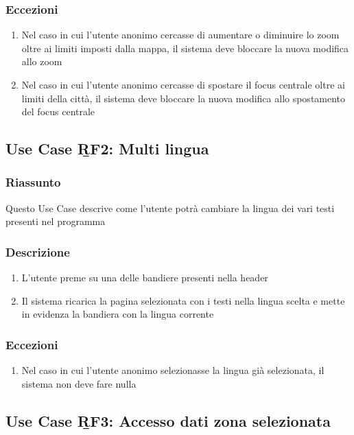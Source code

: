         \subsubsection{Eccezioni}
            \begin{enumerate}
                \item Nel caso in cui l'utente anonimo cercasse di aumentare o diminuire lo zoom oltre ai limiti imposti dalla mappa, il sistema deve bloccare la nuova modifica allo zoom
                \item Nel caso in cui l'utente anonimo cercasse di spostare il focus centrale oltre ai limiti della città, il sistema deve bloccare la nuova modifica allo spostamento del focus centrale
            \end{enumerate}
            
    \subsection{Use Case \b{RF2}: Multi lingua}
        \subsubsection{Riassunto}
            Questo Use Case descrive come l'utente potrà cambiare la lingua dei vari testi presenti nel programma
        \subsubsection{Descrizione}
            \begin{enumerate}
                \item L'utente preme su una delle bandiere presenti nella header
                \item Il sistema ricarica la pagina selezionata con i testi nella lingua scelta e mette in evidenza la bandiera con la lingua corrente
            \end{enumerate}
        \subsubsection{Eccezioni}
            \begin{enumerate}
                \item Nel caso in cui l'utente anonimo selezionasse la lingua già selezionata, il sistema non deve fare nulla
            \end{enumerate}

    \subsection{Use Case \b{RF3}: Accesso dati zona selezionata}

